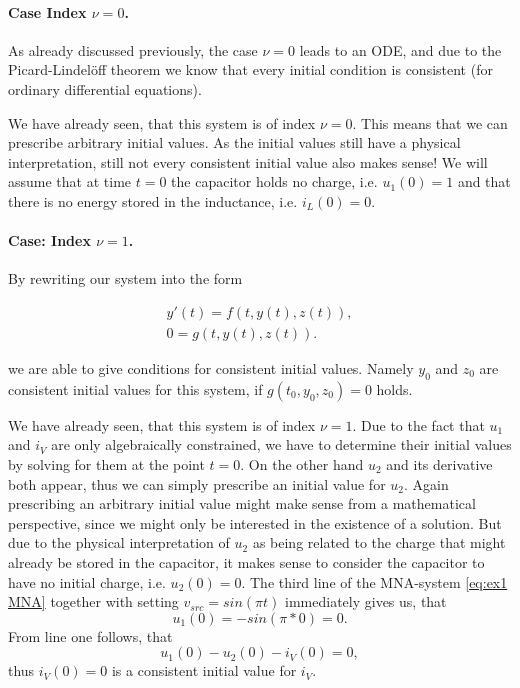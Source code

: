 
\paragraph{Case Index $\nu = 0$. } 
As already discussed previously, the case $\nu = 0$ leads to an ODE, and due to the Picard-Lindelöff theorem  we know that every initial condition is consistent (for ordinary differential equations).

\begin{example2}
	We have already seen, that this system is of index $\nu = 0$. This means that we can prescribe arbitrary initial values. As the initial values still have a physical interpretation, still not every consistent initial value also makes sense! We will assume that at time $t=0$ the capacitor holds no charge, i.e. $u_1(0) = 1$ and that there is no energy stored in the inductance, i.e. $i_L(0) = 0$.
\end{example2}


\paragraph{Case: Index $\nu = 1$.}

By rewriting our system into the form

\begin{align*}
	y'(t) = f(t,y(t),z(t)), \\
	0 = g(t,y(t),z(t)).
\end{align*}

we are able to give conditions for consistent initial values. Namely $y_0$ and $z_0$ are consistent initial values for this system, if $g(t_0, y_0, z_0) = 0$ holds.

\begin{example1}
	We have already seen, that this system is of index $\nu=1$. Due to the fact that $u_1$ and $i_V$ are only algebraically constrained, we have to determine their initial values by solving for them at the point $t=0$. On the other hand $u_2$ and its derivative both appear, thus we can simply prescribe an initial value for $u_2$. Again prescribing an arbitrary initial value might make sense from a mathematical perspective, since we might only be interested in the existence of a solution. But due to the physical interpretation of $u_2$ as being related to the charge that might already be stored in the capacitor, it makes sense to consider the capacitor to have no initial charge, i.e. $u_2(0) = 0$.
	The third line of the MNA-system \eqref{eq:ex1 MNA} together with setting $v_{src} = sin(\pi t)$ immediately gives us, that
	\begin{displaymath}
		u_1(0) = -sin(\pi * 0) = 0.
	\end{displaymath}
	From line one follows, that
	\begin{displaymath}
		u_1(0) - u_2(0) - i_V(0) = 0,
	\end{displaymath}
	thus $i_V(0) = 0$ is a consistent initial value for $i_V$.
\end{example1}

